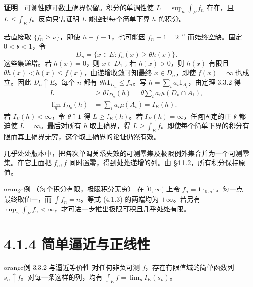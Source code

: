 \documentclass[11pt,a4paper]{article}
\begin{document}
\textbf{证明}　可测性随可数上确界保留。积分的单调性使
\(L=\sup_n\int_E f_n\) 存在，且 \(L\le\int_E f\)。反向只需证明 \(L\)
能控制每个简单下界 \(h\) 的积分。

若直接取 \(\{f_n\ge h\}\)，即使 \(h=f=1\)，也可能因 \(f_n=1-2^{-n}\)
而始终空缺。固定 \(0<\theta<1\)，令 \begin{equation*}
D_n=\{x\in E:f_n(x)\ge\theta h(x)\}.
\end{equation*} 这些集递增。若 \(h(x)=0\)，则 \(x\in D_1\)；若 \(h(x)>0\)，则
\(h(x)\) 有限且 \(\theta h(x)<h(x)\le f(x)\)，由递增收敛可知最终
\(x\in D_n\)，即使 \(f(x)=\infty\) 也成立。因此 \(D_n\uparrow E\)。每个
\(n\) 都有 \(\theta h\mathbf1_{D_n}\le f_n\)。写
\(h=\sum_i a_i\mathbf1_{A_i}\)，由定理 3.3.2 得 \begin{equation*}
\begin{aligned}
L&\ge \theta I_{D_n}(h)
   =\theta\sum_i a_i\mu(D_n\cap A_i),\\
\lim_n I_{D_n}(h)&=\sum_i a_i\mu(A_i)=I_E(h).
\end{aligned}
\end{equation*} 若 \(I_E(h)<\infty\)，令 \(\theta\uparrow1\) 得 \(L\ge I_E(h)\)。若
\(I_E(h)=\infty\)，任何固定的正 \(\theta\) 都迫使
\(L=\infty\)。最后对所有 \(h\) 取上确界，得
\(L\ge\int_E f\)。即使每个简单下界的积分有限而其上确界无穷，这个取上确界的论证仍然有效。

几乎处处版本中，把各次单调关系失效的可测零集及极限例外集合并为一个可测零集。在它上面把
\(f_n,f\) 同时置零，得到处处递增的列。由 §4.1.2，所有积分保持原值。

\begin{sboxenv}{orange}{例 （每个积分有限，极限积分无穷）}
在 \([0,\infty)\) 上令 \(f_n=\mathbf1_{[0,n]}\)。每一点最终取值一，而
\(\int f_n=n\)。等式 (4.1.3) 的两端均为 \(+\infty\)。若另有
\(\sup_n\int_E f_n<\infty\)，才可进一步推出极限可积且几乎处处有限。

\end{sboxenv}

\clearpage\section[\S{}4.1.4
简单逼近与正线性]{4.1.4
简单逼近与正线性}\label{ux7b80ux5355ux903cux8fd1ux4e0eux6b63ux7ebfux6027}

\begin{sboxenv}{orange}{例 3.3.2 与逼近等价性}
对任何非负可测 \(f\)，存在有限值域的简单函数列
\(s_n\uparrow f\)。对每一条这样的列，均有 \(\int_E f=\lim_n I_E(s_n)\)。

\end{sboxenv}
\end{document}
